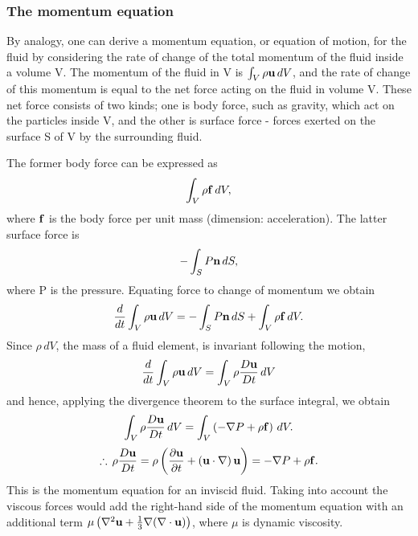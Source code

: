 \bigskip
\subsubsection{The momentum equation}
By analogy, one can derive a momentum equation, or equation of motion, for the fluid by considering
the rate of change of the total momentum of the fluid inside a volume V. The momentum of the fluid
in V is $\int_{V} \rho {\bf u} \,dV$, and the rate of change of this momentum is equal to the net
force acting on the fluid in volume V. These net force consists of two kinds; one is body force, such
as gravity, which act on the particles inside V, and the other is surface force - forces exerted on 
the surface S of V by the surrounding fluid. 

The former body force can be expressed as
\begin{equation}
  \int_{V} \rho {\bf f} \, dV,
\end{equation}
where ${\bf f}$ is the body force per unit mass (\ie dimension: acceleration). 
The latter surface force is
\begin{equation}
  -\int_{S} P {\bf n}\,dS,
\end{equation}
where P is the pressure. Equating force to change of momentum we obtain
\begin{equation}
  \frac{d}{dt} \int_{V} \rho {\bf u} \,dV = -\int_{S} P {\bf n} \,dS
                                        +\int_{V} \rho {\bf f} \, dV.
\end{equation}
Since $\rho \, dV$, the mass of a fluid element, is invariant following the motion,
\begin{equation}
  \frac{d}{dt} \int_{V} \rho {\bf u} \,dV = \int_{V} \rho \frac{D{\bf u}}{Dt} \,dV 
\end{equation}
and hence, applying the divergence theorem to the surface integral, we obtain
\begin{equation}
  \int_{V} \rho \frac{D{\bf u}}{Dt} \,dV = \int_{V} \left( -\nabla P + \rho {\bf f} \right)\, dV.
\end{equation}
\begin{equation}\label{eq:momentum}
  \therefore \, \rho \frac{D{\bf u}}{Dt} = \rho \left( \frac{\partial {\bf u}}{\partial t} 
              + \left( {\bf u} \cdot \nabla \right) {\bf u} \right) = -\nabla P + \rho {\bf f}.
\end{equation}
This is the momentum equation for an inviscid fluid. Taking into account the viscous forces
would add the right-hand side of the momentum equation with an additional term 
$\mu \left( \nabla^{2} {\bf u} + \frac{1}{3}\nabla (\nabla \cdot {\bf u})\right)$, where
$\mu$ is dynamic viscosity.

